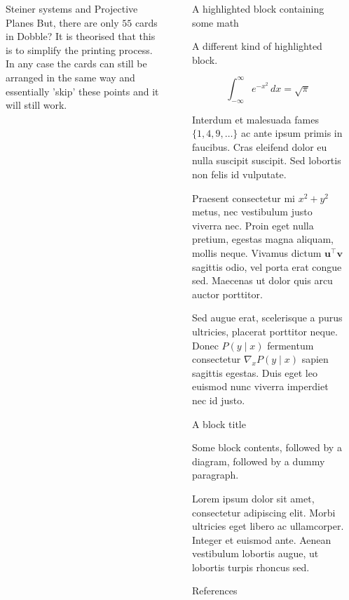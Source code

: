 \documentclass[final]{beamer}
\newlength{\sepwidth}
\newlength{\colwidth}
\newcommand{\separatorcolumn}{\begin{column}{\sepwidth}\end{column}}
\begin{document}
\begin{frame}[t]
\begin{columns}[t]
\begin{column}{\colwidth}
\begin{block}{Steiner systems and Projective Planes}
But, there are only $55$ cards in Dobble? It is theorised that this is to simplify the printing process. In any case the cards can still be arranged in the same way and essentially 'skip' these points and it will still work. 

  \end{block}



\end{column}

\separatorcolumn

\begin{column}{\colwidth}

  \begin{exampleblock}{A highlighted block containing some math}

    A different kind of highlighted block.

    $$
    \int_{-\infty}^{\infty} e^{-x^2}\,dx = \sqrt{\pi}
    $$

    Interdum et malesuada fames $\{1, 4, 9, \ldots\}$ ac ante ipsum primis in
    faucibus. Cras eleifend dolor eu nulla suscipit suscipit. Sed lobortis non
    felis id vulputate.


    Praesent consectetur mi $x^2 + y^2$ metus, nec vestibulum justo viverra
    nec. Proin eget nulla pretium, egestas magna aliquam, mollis neque. Vivamus
    dictum $\mathbf{u}^\intercal\mathbf{v}$ sagittis odio, vel porta erat
    congue sed. Maecenas ut dolor quis arcu auctor porttitor.


    Sed augue erat, scelerisque a purus ultricies, placerat porttitor neque.
    Donec $P(y \mid x)$ fermentum consectetur $\nabla_x P(y \mid x)$ sapien
    sagittis egestas. Duis eget leo euismod nunc viverra imperdiet nec id
    justo.

  \end{exampleblock}

  \begin{block}{A block title}

    Some block contents, followed by a diagram, followed by a dummy paragraph.

    Lorem ipsum dolor sit amet, consectetur adipiscing elit. Morbi ultricies
    eget libero ac ullamcorper. Integer et euismod ante. Aenean vestibulum
    lobortis augue, ut lobortis turpis rhoncus sed. 
  \end{block}

  \begin{block}{References}
   \nocite{*}
   \footnotesize{}

  \end{block}

\end{column}

\separatorcolumn
\end{columns}
\end{frame}
\end{document}
